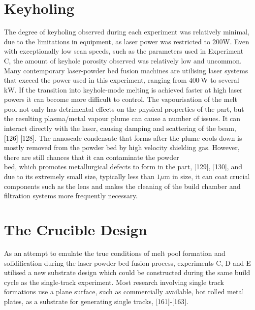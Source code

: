 \documentclass[10pt]{article}
\begin{document}
\section*{Keyholing}
The degree of keyholing observed during each experiment was relatively minimal, due to the limitations in equipment, as laser power was restricted to 200W. Even with exceptionally low scan speeds, such as the parameters used in Experiment C, the amount of keyhole porosity observed was relatively low and uncommon. Many contemporary laser-powder bed fusion machines are utilising laser systems that exceed the power used in this experiment, ranging from $400 \mathrm{~W}$ to several $\mathrm{kW}$. If the transition into keyhole-mode melting is achieved faster at high laser powers it can become more difficult to control. The vapourisation of the melt pool not only has detrimental effects on the physical properties of the part, but the resulting plasma/metal vapour plume can cause a number of issues. It can interact directly with the laser, causing damping and scattering of the beam, [126]-[128]. The nanoscale condensate that forms after the plume cools down is mostly removed from the powder bed by high velocity shielding gas. However, there are still chances that it can contaminate the powder\\
bed, which promotes metallurgical defects to form in the part, [129], [130], and due to its extremely small size, typically less than $1 \mu \mathrm{m}$ in size, it can coat crucial components such as the lens and makes the cleaning of the build chamber and filtration systems more frequently necessary.

\section*{The Crucible Design}
As an attempt to emulate the true conditions of melt pool formation and solidification during the laser-powder bed fusion process, experiments C, D and E utilised a new substrate design which could be constructed during the same build cycle as the single-track experiment. Most research involving single track formations use a plane surface, such as commercially available, hot rolled metal plates, as a substrate for generating single tracks, [161]-[163].
\end{document}
